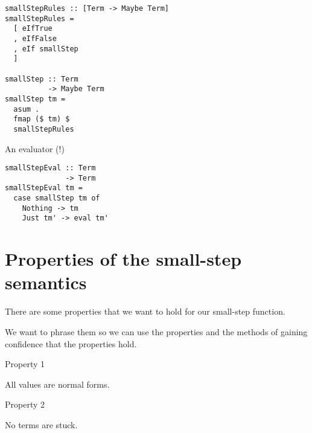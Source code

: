 \documentclass{beamer}
\begin{document}
\begin{frame}[fragile]
 \begin{verbatim}
smallStepRules :: [Term -> Maybe Term]
smallStepRules =
  [ eIfTrue
  , eIfFalse
  , eIf smallStep
  ]

smallStep :: Term 
          -> Maybe Term
smallStep tm =
  asum .
  fmap ($ tm) $
  smallStepRules
 \end{verbatim}
\end{frame}

\begin{frame}[fragile]
  \begin{center}
An evaluator (!)
  \end{center}
 \begin{verbatim}
smallStepEval :: Term 
              -> Term
smallStepEval tm =
  case smallStep tm of
    Nothing -> tm
    Just tm' -> eval tm'
 \end{verbatim}
\end{frame}

\section{Properties of the small-step semantics}

\begin{frame}[c]
  \begin{center}
There are some properties that we want to hold for our small-step function.
  \end{center}
\end{frame}

\begin{frame}[c]
  \begin{center}
We want to phrase them so we can use the properties and the methods of gaining
confidence that the properties hold.
  \end{center}
\end{frame}

\begin{frame}[c]
  Property 1
  \begin{center}
All values are normal forms.
  \end{center}
\end{frame}

\begin{frame}[c]
  Property 2
  \begin{center}
No terms are stuck.
  \end{center}
\end{frame}
\end{document}
